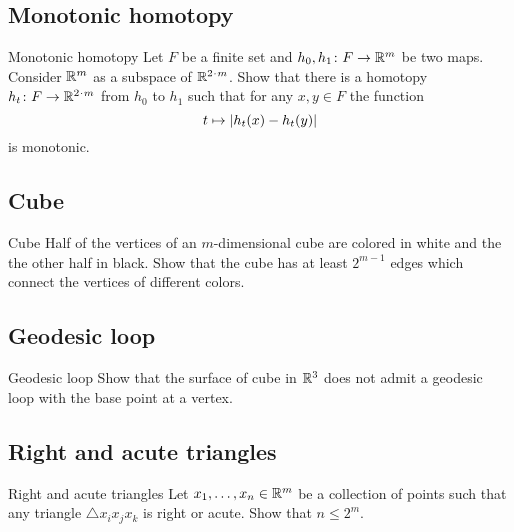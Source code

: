 \subsection*{Monotonic homotopy}
\label{mono-homotopy}

\begin{pr}{}{Monotonic homotopy} 
Let $F$ be a finite set and $h_0,h_1\colon F\to\mathbb{R}^m$ be two maps.
Consider $\mathbb{R}^m$ as a subspace of $\RR^{2\cdot m}$.
Show that there is a homotopy  $h_t\:F\to\RR^{2\cdot m}$ from $h_0$ to $h_1$ such that for any $x,y\in F$ the function 
\[t\z\mapsto |h_t(x)-h_t(y)|\] 
is monotonic.
\end{pr}

\subsection*{Cube}

\begin{pr}{}{Cube}\label{Cube}
Half of the vertices 
of an $m$-dimensional cube
are colored in white and the the other half in black.
Show that the cube has at least $2^{m-1}$ edges which connect the vertices of different colors. 
\end{pr}

\subsection*{Geodesic loop}

\begin{pr}{}{Geodesic loop}\label{Geodesic loop}
Show that the surface of cube in $\mathbb{R}^3$
does not admit a geodesic loop with the base point at a vertex.
\end{pr}

\subsection*{Right and acute triangles}

\begin{pr}{}{Right and acute triangles}\label{Right and acute triangles}
Let $x_1,\dots,x_n\in\mathbb{R}^m$
be a collection of points such that any triangle $\triangle x_ix_jx_k$ is right or acute.
Show that $n\le 2^m$.
\end{pr}



